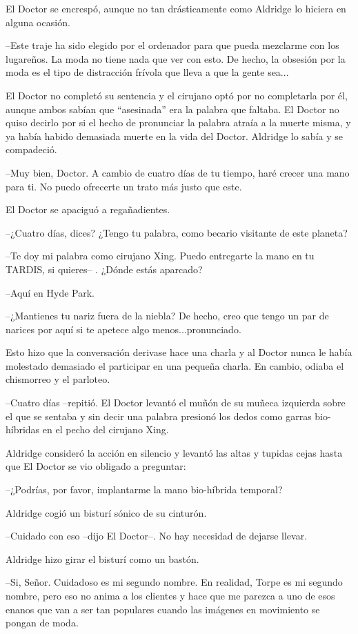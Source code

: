 El Doctor se encrespó, aunque no tan drásticamente como Aldridge lo  hiciera en alguna ocasión.

--Este traje ha sido elegido por el ordenador para que pueda mezclarme con los lugareños. La moda no tiene nada que ver con esto. De hecho, la obsesión por la moda es el tipo de distracción frívola que lleva a que la gente sea...

El Doctor no completó su sentencia y el cirujano optó por no completarla por él, aunque ambos sabían que ``asesinada'' era la palabra que faltaba. El Doctor no quiso decirlo por si el hecho de pronunciar la palabra atraía a la muerte misma, y ya había habido demasiada muerte en la vida del Doctor. Aldridge lo sabía y se compadeció.

--Muy bien, Doctor. A cambio de cuatro días de tu tiempo, haré crecer una mano para ti. No puedo ofrecerte un trato más justo que este.

El Doctor se apaciguó a regañadientes. 

--¿Cuatro días, dices? ¿Tengo tu palabra, como becario visitante de este planeta?

--Te doy mi palabra como cirujano Xing. Puedo entregarte la mano en tu TARDIS, si quieres-- . ¿Dónde estás aparcado? 

--Aquí en Hyde Park.

--¿Mantienes tu nariz fuera de la niebla? De hecho, creo que tengo un par de narices por aquí si te apetece algo menos...pronunciado.

Esto hizo que la conversación derivase hace una charla y al Doctor nunca le había molestado demasiado el participar en una pequeña charla. En cambio, odiaba el chismorreo y el parloteo.

--Cuatro días --repitió. El Doctor levantó el muñón de su muñeca izquierda sobre el que se sentaba y sin decir una palabra presionó los dedos como garras bio-híbridas en el pecho del cirujano Xing.

Aldridge consideró la acción en silencio y levantó las altas y tupidas cejas hasta que El Doctor se vio obligado a preguntar: 

--¿Podrías, por favor, implantarme la mano bio-híbrida temporal?

Aldridge cogió un bisturí sónico de su cinturón.

--Cuidado con eso --dijo El Doctor--. No hay necesidad de dejarse llevar.

Aldridge hizo girar el bisturí como un bastón. 

--Si, Señor. Cuidadoso es mi segundo nombre. En realidad, Torpe es mi segundo nombre, pero eso no anima a los clientes y hace que me parezca a uno de esos enanos que van a ser tan populares cuando las imágenes en movimiento se pongan de moda.

